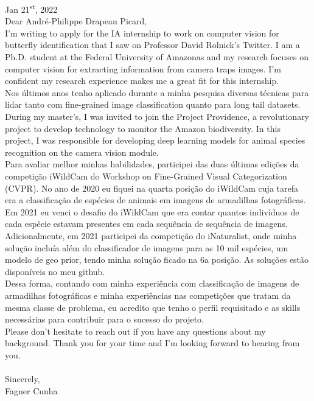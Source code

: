 \documentclass[10pt]{developercv}
\begin{document}
\begin{minipage}[t]{\textwidth}
\large
Jan 21\textsuperscript{st}, 2022\\

Dear André-Philippe Drapeau Picard,\\

I'm writing to apply for the IA internship to work on computer vision for 
butterfly identification that I saw on Professor David Rolnick's Twitter. I am a 
Ph.D. student at the Federal University of Amazonas and my research focuses on 
computer vision for extracting information from camera traps images. I'm 
confident my research experience makes me a great fit for this internship.\\

Nos últimos anos tenho aplicado durante a minha pesquisa diversas técnicas para 
lidar tanto com fine-grained image classification quanto para long tail 
datasets. During my master's, I was invited to join the Project 
Providence, a revolutionary project to develop technology to monitor the Amazon 
biodiversity. In this project, I was responsible for developing deep learning 
models for animal species recognition on the camera vision module.\\

Para avaliar melhor minhas habilidades, participei das duas últimas edições da 
competição iWildCam do Workshop on Fine-Grained Visual Categorization (CVPR). 
No ano de 2020 eu fiquei na quarta posição do iWildCam cuja tarefa era a 
classificação de espécies de animais em imagens de armadilhas fotográficas. Em 
2021 eu venci o desafio do iWildCam que era contar quantos indivíduos de cada 
espécie estavam presentes em cada sequência de sequência de imagens. 
Adicionalmente, em 2021 participei da competição do iNaturalist, onde minha 
solução incluía além do classificador de imagens para as 10 mil espécies, um 
modelo de geo prior, tendo minha solução ficado na 6a posição. As soluções 
estão disponíveis no meu github.\\

Dessa forma, contando com minha experiência com classificação de imagens de 
armadilhas fotográficas e minha experiências nas competições que tratam da 
mesma classe de problema, eu acredito que tenho o perfil requisitado e as 
skills necessárias para contribuir para o sucesso do projeto.\\

Please don't hesitate to reach out if you have any questions about my 
background. Thank you for your time and I'm looking forward to hearing from 
you.\\\\

Sincerely,\\

Fagner Cunha

\end{minipage}
\end{document}
